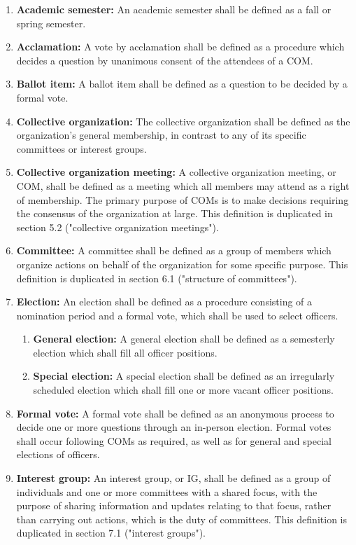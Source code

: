 \documentclass[11pt]{article}
\newcounter{h1}
\newcounter{h2}[h1]
\newcounter{h3}[h2]
\begin{document}

\begin{enumerate}
  \item \textbf{Academic semester:} An academic semester shall be defined as a fall or spring semester.
  \item \textbf{Acclamation:} A vote by acclamation shall be defined as a procedure which decides a question by unanimous consent of the attendees of a COM.
  \item \textbf{Ballot item:} A ballot item shall be defined as a question to be decided by a formal vote.
  \item \textbf{Collective organization:} The collective organization shall be defined as the organization's general membership, in contrast to any of its specific committees or interest groups.
  \item \textbf{Collective organization meeting:} A collective organization meeting, or COM, shall be defined as a meeting which all members may attend as a right of membership. The primary purpose of COMs is to make decisions requiring the consensus of the organization at large. This definition is duplicated in section 5.2 ("collective organization meetings").
  \item \textbf{Committee:} A committee shall be defined as a group of members which organize actions on behalf of the organization for some specific purpose. This definition is duplicated in section 6.1 ("structure of committees").
  \item \textbf{Election:} An election shall be defined as a procedure consisting of a nomination period and a formal vote, which shall be used to select officers.
        \begin{enumerate}
          \item \textbf{General election:} A general election shall be defined as a semesterly election which shall fill all officer positions.
          \item \textbf{Special election:} A special election shall be defined as an irregularly scheduled election which shall fill one or more vacant officer positions.
        \end{enumerate}
  \item \textbf{Formal vote:} A formal vote shall be defined as an anonymous process to decide one or more questions through an in-person election. Formal votes shall occur following COMs as required, as well as for general and special elections of officers.
  \item \textbf{Interest group:} An interest group, or IG, shall be defined as a group of individuals and one or more committees with a shared focus, with the purpose of sharing information and updates relating to that focus, rather than carrying out actions, which is the duty of committees. This definition is duplicated in section 7.1 ("interest groups").

\end{enumerate}
\end{document}
